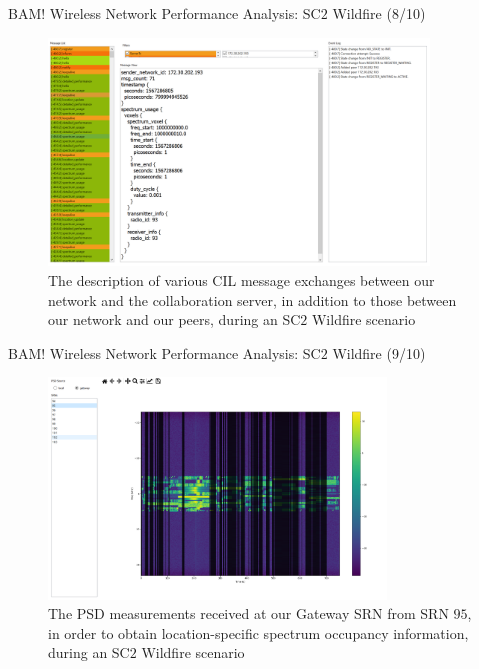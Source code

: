 \documentclass{beamer}
\begin{document}
\begin{frame}{BAM! Wireless Network Performance Analysis: SC$2$ Wildfire (8/10)}
\begin{figure}
    \centering
    \includegraphics[width = 0.90\textwidth]{Wildfire_Collab.PNG}
    \caption{The description of various CIL message exchanges between our network and the collaboration server, in addition to those between our network and our peers, during an SC$2$ Wildfire scenario}
    \label{fig:26}
\end{figure}
\end{frame}
\begin{frame}{BAM! Wireless Network Performance Analysis: SC$2$ Wildfire (9/10)}
\begin{figure}
    \centering
    \includegraphics[width = 0.80\textwidth]{Wildfire_PSD.PNG}
    \caption{The PSD measurements received at our Gateway SRN from SRN $95$, in order to obtain location-specific spectrum occupancy information, during an SC$2$ Wildfire scenario}
    \label{fig:27}
\end{figure}
\end{frame}
\end{document}

